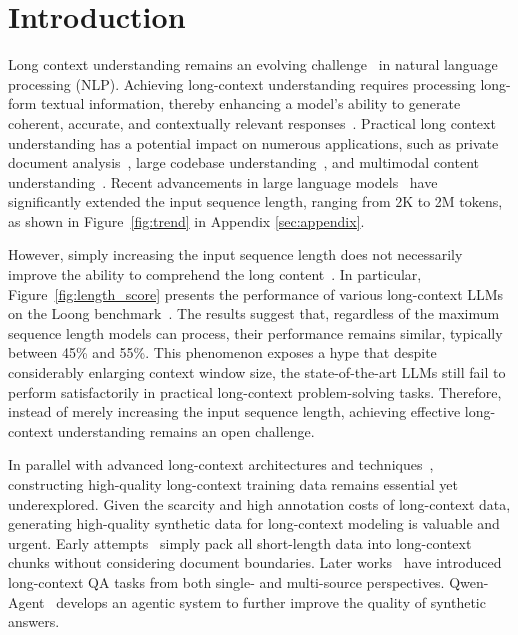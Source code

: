 \section{Introduction} \label{sec:intro}
\vspace{-2mm}



Long context understanding remains an evolving challenge~\cite{kocisky2018narrativeqa,wu2021recursively,bai2024longbench,wang2024leave} in natural language processing (NLP). 
Achieving long-context understanding requires processing long-form textual information, thereby enhancing a model’s ability to generate coherent, accurate, and contextually relevant responses~\cite{ibm2024llmcontext}.
Practical long context understanding has a potential impact on numerous applications, such as private document analysis~\cite{mukherjee2023feasibility}, large codebase understanding~\cite{nam2024using}, and multimodal content understanding~\cite{chandrasegaran2024hourvideo,lin2023videoxum,tang2023video,chen2023fine}.
Recent advancements in large language models~\cite{ouyang2022training,reid2024gemini,dubey2024llama} have significantly extended the input sequence length, ranging from 2K to 2M tokens, as shown in Figure~\ref{fig:trend} in Appendix \ref{sec:appendix}.

However, simply increasing the input sequence length does not necessarily improve the ability to comprehend the long content~\cite{yang2024qwen2,goldman2024really}. In particular, Figure~\ref{fig:length_score} presents the performance of various long-context LLMs on the Loong benchmark~\cite{wang2024leave}. The results suggest that, regardless of the maximum sequence length models can process, their performance remains similar, typically between 45\% and 55\%. This phenomenon exposes a hype that despite considerably enlarging context window size, the state-of-the-art LLMs still fail to perform satisfactorily in practical long-context problem-solving tasks.
Therefore, instead of merely increasing the input sequence length, achieving effective long-context understanding remains an open challenge.

In parallel with advanced long-context architectures and techniques~\cite{peng2024yarn,liu2024ringattention,dao2024transformers}, constructing high-quality long-context training data remains essential yet underexplored.
Given the scarcity and high annotation costs of long-context data, generating high-quality synthetic data for long-context modeling is valuable and urgent. Early attempts~\cite{raffel2020exploring,fu2024data} simply pack all short-length data into long-context chunks without considering document boundaries.
Later works~\cite{zhang2024extending,he2024never} have introduced long-context QA tasks from both single- and multi-source perspectives.
Qwen-Agent~\cite{yang2024qwen2} develops an agentic system to further improve the quality of synthetic answers.

